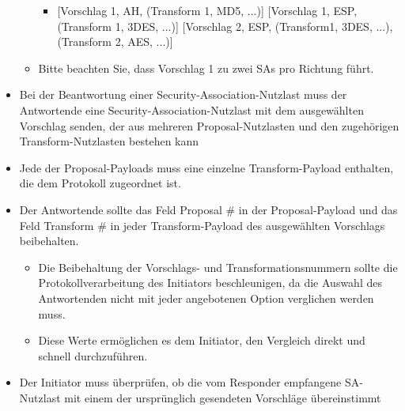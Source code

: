 \documentclass[a4paper]{article}
\begin{document}
\begin{multicols}{3}
\begin{itemize}
\begin{itemize}
                        \begin{itemize}
                            \item
                                  {[}Vorschlag 1, AH, (Transform 1, MD5, ...){]} {[}Vorschlag 1,
                                  ESP, (Transform 1, 3DES, ...){]} {[}Vorschlag 2, ESP, (Transform1,
                                  3DES, ...), (Transform 2, AES, ...){]}
                        \end{itemize}
                  \item
                        Bitte beachten Sie, dass Vorschlag 1 zu zwei SAs pro Richtung führt.
              \end{itemize}
        \item
              Bei der Beantwortung einer Security-Association-Nutzlast muss der
              Antwortende eine Security-Association-Nutzlast mit dem ausgewählten
              Vorschlag senden, der aus mehreren Proposal-Nutzlasten und den
              zugehörigen Transform-Nutzlasten bestehen kann
        \item
              Jede der Proposal-Payloads muss eine einzelne Transform-Payload
              enthalten, die dem Protokoll zugeordnet ist.
        \item
              Der Antwortende sollte das Feld Proposal \# in der Proposal-Payload
              und das Feld Transform \# in jeder Transform-Payload des ausgewählten
              Vorschlags beibehalten.

              \begin{itemize}
                  \item
                        Die Beibehaltung der Vorschlags- und Transformationsnummern sollte
                        die Protokollverarbeitung des Initiators beschleunigen, da die
                        Auswahl des Antwortenden nicht mit jeder angebotenen Option
                        verglichen werden muss.
                  \item
                        Diese Werte ermöglichen es dem Initiator, den Vergleich direkt und
                        schnell durchzuführen.
              \end{itemize}
        \item
              Der Initiator muss überprüfen, ob die vom Responder empfangene
              SA-Nutzlast mit einem der ursprünglich gesendeten Vorschläge
              übereinstimmt
    \end{itemize}



\end{multicols}
\end{document}
